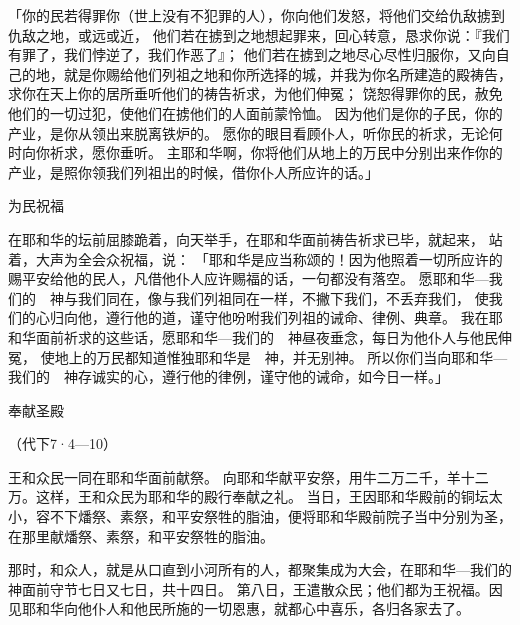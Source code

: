 {\par }{\PP {}「你的民若得罪你（世上没有不犯罪的人），你向他们发怒，将他们交给仇敌掳到仇敌之地，或远或近，
他们若在掳到之地想起罪来，回心转意，恳求你说：『我们有罪了，我们悖逆了，我们作恶了』；
他们若在掳到之地尽心尽性归服你，又向自己的地，就是你赐给他们列祖之地和你所选择的城，并我为你名所建造的殿祷告，
求你在天上你的居所垂听他们的祷告祈求，为他们伸冤；
饶恕得罪你的民，赦免他们的一切过犯，使他们在掳他们的人面前蒙怜恤。
因为他们是你的子民，你的产业，是你从{}领出来脱离铁炉的。
愿你的眼目看顾仆人，听你民{}的祈求，无论何时向你祈求，愿你垂听。
主耶和华啊，你将他们从地上的万民中分别出来作你的产业，是照你领我们列祖出{}的时候，借你仆人{}所应许的话。」
\par }{\SH 为民祝福
\par }{\PP {}在耶和华的坛前屈膝跪着，向天举手，在耶和华面前祷告祈求已毕，就起来，
站着，大声为{}全会众祝福，说：
「耶和华是应当称颂的！因为他照着一切所应许的赐平安给他的民{}人，凡借他仆人{}应许赐福的话，一句都没有落空。
愿耶和华—我们的　神与我们同在，像与我们列祖同在一样，不撇下我们，不丢弃我们，
使我们的心归向他，遵行他的道，谨守他吩咐我们列祖的诫命、律例、典章。
我在耶和华面前祈求的这些话，愿耶和华—我们的　神昼夜垂念，每日为他仆人与他民{}伸冤，
使地上的万民都知道惟独耶和华是　神，并无别神。
所以你们当向耶和华—我们的　神存诚实的心，遵行他的律例，谨守他的诫命，{}如今日一样。」
\par }{\SH 奉献圣殿
\par }{\R （代下7·4—10）
\par }{\PP {}王和{}众民一同在耶和华面前献祭。
向耶和华献平安祭，用牛二万二千，羊十二万。这样，王和{}众民为耶和华的殿行奉献之礼。
当日，王因耶和华殿前的铜坛太小，容不下燔祭、素祭，和平安祭牲的脂油，便将耶和华殿前院子当中分别为圣，在那里献燔祭、素祭，和平安祭牲的脂油。
\par }{\PP {}那时，{}和{}众人，就是从{}口直到{}小河所有的{}人，都聚集成为大会，在耶和华—我们的　神面前守节七日又七日，共十四日。
第八日，王遣散众民；他们都为王祝福。因见耶和华向他仆人{}和他民{}所施的一切恩惠，就都心中喜乐，各归各家去了。

}
